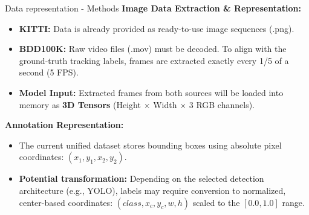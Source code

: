 \documentclass{beamer}
\begin{document}
\begin{frame}{Data representation - Methods}
    \textbf{Image Data Extraction \& Representation:}
    \begin{itemize}
        \item \textbf{KITTI:} Data is already provided as ready-to-use image sequences (.png).
        \item \textbf{BDD100K:} Raw video files (.mov) must be decoded. To align with the ground-truth tracking labels, frames are extracted exactly every 1/5 of a second (5 FPS).
        \item \textbf{Model Input:} Extracted frames from both sources will be loaded into memory as \textbf{3D Tensors} (Height $\times$ Width $\times$ 3 RGB channels).
    \end{itemize}

    \vspace{0.3cm}
    \textbf{Annotation Representation:}
    \begin{itemize}
        \item The current unified dataset stores bounding boxes using absolute pixel coordinates: $(x_1, y_1, x_2, y_2)$.
        \item \textbf{Potential transformation:} Depending on the selected detection architecture (e.g., YOLO), labels may require conversion to normalized, center-based coordinates: $(class, x_c, y_c, w, h)$ scaled to the $[0.0, 1.0]$ range.
    \end{itemize}
\end{frame}
\end{document}
